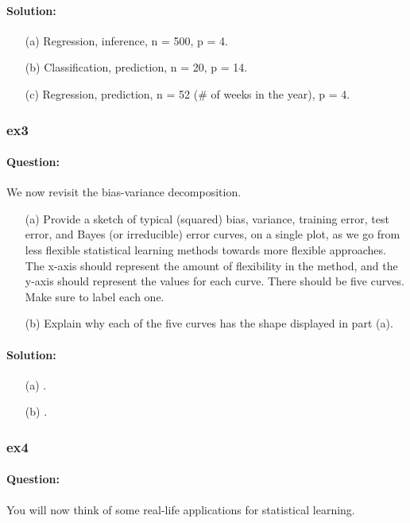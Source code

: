 \documentclass[a4paper,12pt,titlepage]{article} %
\begin{document}
\paragraph{Solution:}
\begin{itemize}
	\item[(a)] Regression, inference, n = 500, p = 4.
	\item[(b)] Classification, prediction, n = 20, p = 14.
	\item[(c)] Regression, prediction, n = 52 (\# of weeks in the year), p = 4.
\end{itemize}


\subsubsection{ex3}
\paragraph{Question:} We now revisit the bias-variance decomposition.

\begin{itemize}
	\item[(a)] Provide a sketch of typical (squared) bias, variance, training error, test error, and Bayes (or irreducible) error curves, on a single plot, as we go from less flexible statistical learning methods towards more flexible approaches. The x-axis should represent the amount of flexibility in the method, and the y-axis should represent the values for each curve. There should be five curves.	Make sure to label each one.
	
	\item[(b)] Explain why each of the five curves has the shape displayed in part (a).	
\end{itemize}
\paragraph{Solution:}
\begin{itemize}
	\item[(a)] .
	\item[(b)] .
\end{itemize}


\subsubsection{ex4}
\paragraph{Question:} You will now think of some real-life applications for statistical learning.
\end{document}
